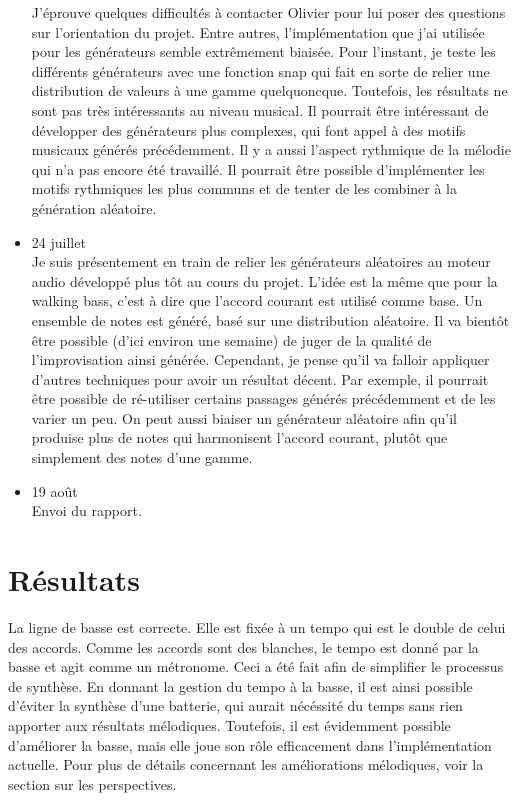 \documentclass[letterpaper,12pt]{scrartcl}
\begin{document}
\begin{itemize}
	J'éprouve quelques difficultés à contacter Olivier pour lui poser des questions sur l'orientation du projet. Entre autres, l'implémentation que j'ai utilisée pour les générateurs semble extrêmement biaisée. Pour l'instant, je teste les différents générateurs avec une fonction snap qui fait en sorte de relier une distribution de valeurs à une gamme quelquoncque. Toutefois, les résultats ne sont pas très intéressants au niveau musical. Il pourrait être intéressant de développer des générateurs plus complexes, qui font appel à des motifs musicaux générés précédemment. Il y a aussi l'aspect rythmique de la mélodie qui n'a pas encore été travaillé. Il pourrait être possible d'implémenter les motifs rythmiques les plus communs et de tenter de les combiner à la génération aléatoire.
	\item 24 juillet\\
	Je suis présentement en train de relier les générateurs aléatoires au moteur audio développé plus tôt au cours du projet. L'idée est la même que pour la walking bass, c'est à dire que l'accord courant est utilisé comme base. Un ensemble de notes est généré, basé sur une distribution aléatoire. Il va bientôt être possible (d'ici environ une semaine) de juger de la qualité de l'improvisation ainsi générée. Cependant, je pense qu'il va falloir appliquer d'autres techniques pour avoir un résultat décent. Par exemple, il pourrait être possible de ré-utiliser certains passages générés précédemment et de les varier un peu. On peut aussi biaiser un générateur aléatoire afin qu'il produise plus de notes qui harmonisent l'accord courant, plutôt que simplement des notes d'une gamme.

	\item 19 août\\
	Envoi du rapport.
	
	\end{itemize}

	\section{Résultats}
	La ligne de basse est correcte. Elle est fixée à un tempo qui est le double de celui des accords. Comme les accords sont des blanches, le tempo est donné par la basse et agit comme un métronome. Ceci a été fait afin de simplifier le processus de synthèse. En donnant la gestion du tempo à la basse, il est ainsi possible d'éviter la synthèse d'une batterie, qui aurait nécéssité du temps sans rien apporter aux résultats mélodiques. Toutefois, il est évidemment possible d'améliorer la basse, mais elle joue son rôle efficacement dans l'implémentation actuelle. Pour plus de détails concernant les améliorations mélodiques, voir la section sur les perspectives. 
	
\end{document}
